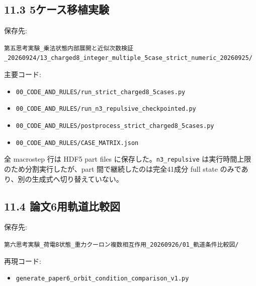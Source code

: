 \documentclass[
  a4paper,
]{ltjsarticle}
\providecommand{\tightlist}{%
  \setlength{\itemsep}{0pt}\setlength{\parskip}{0pt}}
\begin{document}
\subsection{11.3
5ケース移植実験}\label{ux30b1ux30fcux30b9ux79fbux690dux5b9fux9a13}

保存先:

\texttt{第五思考実験\_\allowbreak{}乗法状態内部展開と近似次数検証\_\allowbreak{}20260924/\allowbreak{}13\_\allowbreak{}charged8\_\allowbreak{}integer\_\allowbreak{}multiple\_\allowbreak{}5case\_\allowbreak{}strict\_\allowbreak{}numeric\_\allowbreak{}20260925/\allowbreak{}}

主要コード:

\begin{itemize}
\tightlist
\item
  \texttt{00\_\allowbreak{}CODE\_\allowbreak{}AND\_\allowbreak{}RULES/\allowbreak{}run\_\allowbreak{}strict\_\allowbreak{}charged8\_\allowbreak{}5cases.py}
\item
  \texttt{00\_\allowbreak{}CODE\_\allowbreak{}AND\_\allowbreak{}RULES/\allowbreak{}run\_\allowbreak{}n3\_\allowbreak{}repulsive\_\allowbreak{}checkpointed.py}
\item
  \texttt{00\_\allowbreak{}CODE\_\allowbreak{}AND\_\allowbreak{}RULES/\allowbreak{}postprocess\_\allowbreak{}strict\_\allowbreak{}charged8\_\allowbreak{}5cases.py}
\item
  \texttt{00\_\allowbreak{}CODE\_\allowbreak{}AND\_\allowbreak{}RULES/\allowbreak{}CASE\_\allowbreak{}MATRIX.json}
\end{itemize}

全 macrostep 行は HDF5 part files に保存した。\texttt{n3\_repulsive}
は実行時間上限のため分割実行したが、part 間で継続したのは完全41成分 full
state のみであり、別の生成式へ切り替えていない。

\subsection{11.4
論文6用軌道比較図}\label{ux8ad6ux65876ux7528ux8eccux9053ux6bd4ux8f03ux56f3}

保存先:

\texttt{第六思考実験\_\allowbreak{}荷電8状態\_\allowbreak{}重力クーロン複数相互作用\_\allowbreak{}20260926/\allowbreak{}01\_\allowbreak{}軌道条件比較図/\allowbreak{}}

再現コード:

\begin{itemize}
\tightlist
\item
  \texttt{generate\_paper6\_orbit\_condition\_comparison\_v1.py}
\end{itemize}
\end{document}
